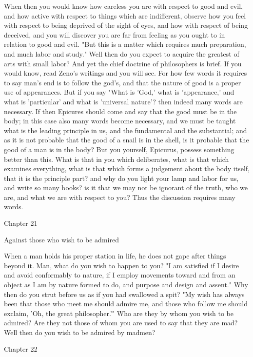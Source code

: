 \documentclass[a4paper]{article}
\begin{document}
When then you would know how careless you are with respect to good
and evil, and how active with respect to things which are indifferent,
observe how you feel with respect to being deprived of the sight of
eyes, and how with respect of being deceived, and you will discover
you are far from feeling as you ought to in relation to good and evil.
"But this is a matter which requires much preparation, and much labor
and study." Well then do you expect to acquire the greatest of arts
with small labor? And yet the chief doctrine of philosophers is brief.
If you would know, read Zeno's writings and you will see. For how
few words it requires to say man's end is to follow the god's, and
that the nature of good is a proper use of appearances. But if you
say "What is 'God,' what is 'appearance,' and what is 'particular'
and what is 'universal nature'? then indeed many words are necessary.
If then Epicures should come and say that the good must be in the
body; in this case also many words become necessary, and we must be
taught what is the leading principle in us, and the fundamental and
the substantial; and as it is not probable that the good of a snail
is in the shell, is it probable that the good of a man is in the body?
But you yourself, Epicurus, possess something better than this. What
is that in you which deliberates, what is that which examines everything,
what is that which forms a judgement about the body itself, that it
is the principle part? and why do you light your lamp and labor for
us, and write so many books? is it that we may not be ignorant of
the truth, who we are, and what we are with respect to you? Thus the
discussion requires many words. 

Chapter 21

Against those who wish to be admired 

When a man holds his proper station in life, he does not gape after
things beyond it. Man, what do you wish to happen to you? "I am satisfied
if I desire and avoid conformably to nature, if I employ movements
toward and from an object as I am by nature formed to do, and purpose
and design and assent." Why then do you strut before us as if you
had swallowed a spit? "My wish has always been that those who meet
me should admire me, and those who follow me should exclaim, 'Oh,
the great philosopher.'" Who are they by whom you wish to be admired?
Are they not those of whom you are used to say that they are mad?
Well then do you wish to be admired by madmen? 

Chapter 22
\end{document}
